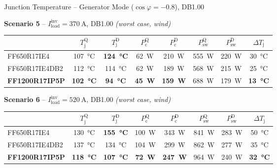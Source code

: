 \documentclass[aspectratio=169, 10pt]{beamer}
\newcommand{\good}[1]{\textcolor{goodgreen}{\textbf{#1}}}
\newcommand{\warn}[1]{\textcolor{warnred}{\textbf{#1}}}
\begin{document}
\begin{frame}{Junction Temperature -- Generator Mode ($\cos\varphi = -0.8$), DB1.00}
	\small
	\renewcommand{\arraystretch}{1.45}
	
	\textbf{Scenario 5} -- $I_\text{load}^\text{inv} = \SI{370}{\ampere}$, DB1.00 \quad\textit{(worst case, wind)}
	\begin{center}
		\begin{tabular}{l c c c c c c c}
			\toprule
			& $T_\text{j}^\text{Q}$ & $T_\text{j}^\text{D}$ & $P_\text{c}^\text{Q}$ & $P_\text{c}^\text{D}$ & $P_\text{sw}^\text{Q}$ & $P_\text{sw}^\text{D}$ & $\Delta T_\text{j}$ \\
			\midrule
			\rowcolor{rowgray}
			FF650R17IE4    & \SI{107}{\celsius} & \warn{\SI{124}{\celsius}} & \SI{62}{W} & \SI{210}{W} & \SI{555}{W} & \SI{220}{W} & \SI{30}{\celsius} \\
			FF650R17IE4DB2 & \SI{112}{\celsius} & \SI{114}{\celsius} & \SI{62}{W} & \SI{189}{W} & \SI{568}{W} & \SI{215}{W} & \SI{25}{\celsius} \\
			\rowcolor{rowgray}
			\textbf{FF1200R17IP5P} & \good{\SI{102}{\celsius}} & \good{\SI{94}{\celsius}} & \good{\SI{45}{W}} & \good{\SI{159}{W}} & \SI{688}{W} & \SI{179}{W} & \good{\SI{13}{\celsius}} \\
			\bottomrule
		\end{tabular}
	\end{center}
	
	\vspace{4pt}
	\textbf{Scenario 6} -- $I_\text{load}^\text{inv} = \SI{520}{\ampere}$, DB1.00 \quad\textit{(worst case, wind)}
	\begin{center}
		\begin{tabular}{l c c c c c c c}
			\toprule
			& $T_\text{j}^\text{Q}$ & $T_\text{j}^\text{D}$ & $P_\text{c}^\text{Q}$ & $P_\text{c}^\text{D}$ & $P_\text{sw}^\text{Q}$ & $P_\text{sw}^\text{D}$ & $\Delta T_\text{j}$ \\
			\midrule
			\rowcolor{rowgray}
			FF650R17IE4    & \SI{130}{\celsius} & \warn{\SI{155}{\celsius}} & \SI{100}{W} & \SI{343}{W} & \SI{841}{W} & \SI{283}{W} & \SI{50}{\celsius} \\
			FF650R17IE4DB2 & \SI{137}{\celsius} & \SI{134}{\celsius} & \SI{104}{W} & \SI{299}{W} & \SI{862}{W} & \SI{277}{W} & \SI{35}{\celsius} \\
			\rowcolor{rowgray}
			\textbf{FF1200R17IP5P} & \good{\SI{118}{\celsius}} & \good{\SI{107}{\celsius}} & \good{\SI{72}{W}} & \good{\SI{247}{W}} & \SI{964}{W} & \SI{240}{W} & \good{\SI{32}{\celsius}} \\
			\bottomrule
		\end{tabular}
	\end{center}
\end{frame}
\end{document}
